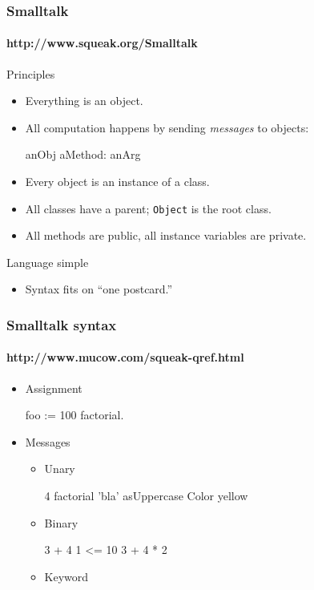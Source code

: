 \documentclass{beamer}
\begin{document}
\begin{frame}[fragile]
\frametitle{Smalltalk}
\framesubtitle{http://www.squeak.org/Smalltalk}
Principles
\begin{itemize}
\item Everything is an object.
\item All computation happens by sending \textit{messages} to objects:
\begin{cplus3}
      anObj aMethod: anArg
\end{cplus3}
\item Every object is an instance of a class.
\item All classes have a parent; \texttt{Object} is the root class.
\item All methods are public, all instance variables are private.
\end{itemize}


Language simple
\begin{itemize}
\item Syntax fits on ``one postcard.''
\end{itemize}
\end{frame}

\begin{frame}[fragile]
\frametitle{Smalltalk syntax}
\framesubtitle{http://www.mucow.com/squeak-qref.html}
\begin{itemize}
\item Assignment
\begin{cplus3}
foo := 100 factorial.
\end{cplus3}

\item Messages
\begin{itemize}
\item Unary
\begin{cplus3}
4 factorial
'bla' asUppercase
Color yellow
\end{cplus3}

\item Binary
\begin{cplus3}
3 + 4
1 <= 10
3 + 4 * 2
\end{cplus3}

\item Keyword 
\end{itemize}
\end{itemize}
\end{frame}
\end{document}
